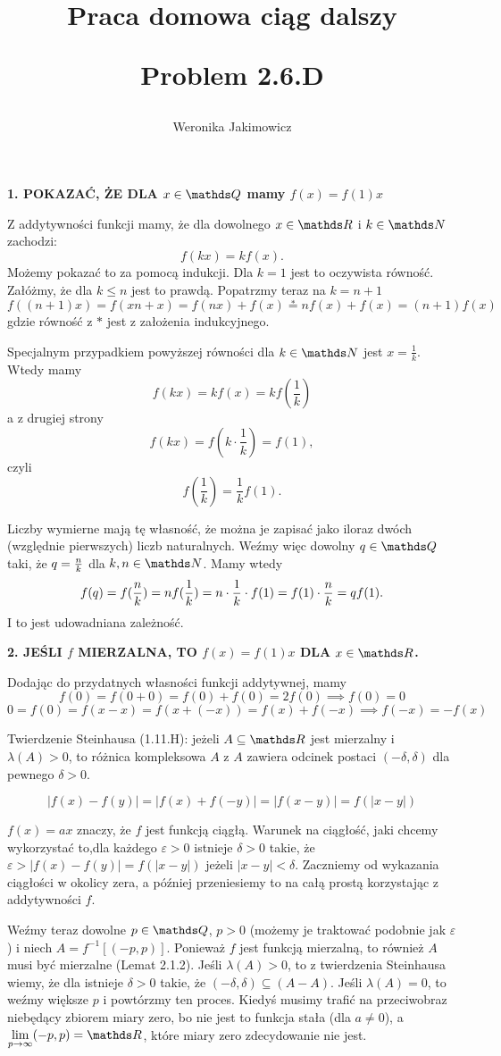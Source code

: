 \documentclass{article}
\title{Praca domowa ciąg dalszy\medskip

\large Problem \textbf{2.6.D}
}
\author{Weronika Jakimowicz}
\date{}
\begin{document}
\maketitle
\thispagestyle{empty}

\textbf{\color{def}1. POKAZAĆ, ŻE DLA $x\in\Q$ mamy $f(x)=f(1)x$}
\medskip

Z addytywności funkcji mamy, że dla dowolnego $x\in\R$ i $k\in\N$ zachodzi:
$$f(kx)=kf(x).$$
Możemy pokazać to za pomocą indukcji. Dla $k=1$ jest to oczywista równość. Załóżmy, że dla $k\leq n$ jest to prawdą. Popatrzmy teraz na $k=n+1$
$$f((n+1)x)=f(xn+x)=f(nx)+f(x)\overset{*}{=}nf(x)+f(x)=(n+1)f(x)$$
gdzie równość z $*$ jest z założenia indukcyjnego.
\medskip

Specjalnym przypadkiem powyższej równości dla $k\in\N$ jest $x=\frac1k$. Wtedy mamy
$$f(kx)=kf(x)=kf(\frac1k)$$
a z drugiej strony
$$f(kx)=f(k\cdot\frac1k)=f(1),$$
czyli
$$f(\frac1k)=\frac1k f(1).$$

Liczby wymierne mają tę własność, że można je zapisać jako iloraz dwóch (względnie pierwszych) liczb naturalnych. Weźmy więc dowolny $q\in\Q$ taki, że $q={n\over k}$ dla $k,n\in\N$. Mamy wtedy
$$f(q)=f(\frac nk)=nf(\frac1k)=n\cdot\frac1k \cdot f(1)=f(1)\cdot{n\over k}=qf(1).$$
I to jest udowadniana zależność.
\bigskip

\textbf{\color{def}2. JEŚLI $f$ MIERZALNA, TO $f(x)=f(1)x$ DLA $x\in\R$.}
\medskip

Dodając do przydatnych własności funkcji addytywnej, mamy
$$f(0)=f(0+0)=f(0)+f(0)=2f(0)\implies f(0)=0$$
$$0=f(0)=f(x-x)=f(x+(-x))=f(x)+f(-x)\implies f(-x)=-f(x)$$

{\color{acc}Twierdzenie Steinhausa} (1.11.H): jeżeli $A\subseteq\R$ jest mierzalny i $\lambda(A)>0$, to różnica kompleksowa $A$ z $A$ zawiera odcinek postaci $(-\delta,\delta)$ dla pewnego $\delta>0$.
\smallskip

$$|f(x)-f(y)|=|f(x)+f(-y)|=|f(x-y)|=f(|x-y|)$$

$f(x)=ax$ znaczy, że $f$ jest funkcją ciągłą. Warunek na ciągłość, jaki chcemy wykorzystać to,dla każdego $\varepsilon>0$ istnieje $\delta>0$ takie, że $\varepsilon>|f(x)-f(y)|=f(|x-y|)$ jeżeli $|x-y|<\delta$. Zaczniemy od wykazania ciągłości w okolicy zera, a później przeniesiemy to na całą prostą korzystając z addytywności $f$.
\medskip

Weźmy teraz dowolne $p\in\Q$, $p>0$ (możemy je traktować podobnie jak $\varepsilon$) i niech $A=f^{-1}[(-p,p)]$. Ponieważ $f$ jest funkcją mierzalną, to również $A$ musi być mierzalne (Lemat 2.1.2). Jeśli $\lambda(A)>0$, to z twierdzenia Steinhausa wiemy, że dla istnieje $\delta>0$ takie, że $(-\delta,\delta)\subseteq (A-A)$. Jeśli $\lambda(A)=0$, to weźmy większe $p$ i powtórzmy ten proces. Kiedyś musimy trafić na przeciwobraz niebędący zbiorem miary zero, bo nie jest to funkcja stała (dla $a\neq0$), a $\lim\limits_{p\to\infty}(-p,p)=\R$, które miary zero zdecydowanie nie jest.
\smallskip
\end{document}
